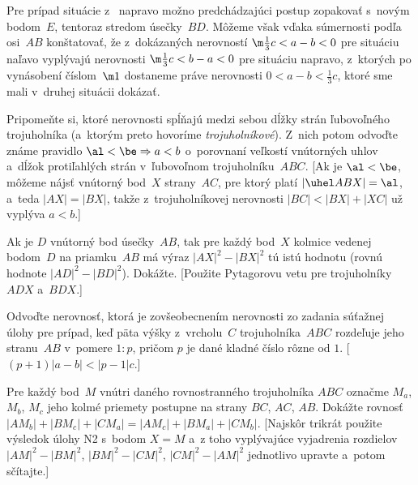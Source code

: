 {Pre prípad situácie z~ napravo možno predchádzajúci postup
zopakovať s~novým bodom~$E$, tentoraz stredom úsečky~$BD$.
Môžeme však vďaka súmernosti podľa osi~$AB$ konštatovať,
že z~dokázaných nerovností ${\m\frac13}c<a-b<0$ pre situáciu naľavo
vyplývajú nerovnosti ${\m\frac13}c<b-a<0$ pre situáciu napravo,
z~ktorých po vynásobení číslom~${\m1}$ dostaneme práve nerovnosti
$0<a-b<\tfrac13 c$, ktoré sme mali v~druhej situácii dokázať.


Pripomeňte si, ktoré nerovnosti spĺňajú medzi sebou
dĺžky strán ľubovoľného trojuholníka (a~ktorým preto hovoríme {\it
trojuholníkové\/}). Z~nich potom odvoďte známe pravidlo
$\al<\be\Rightarrow a<b$ o~porovnaní veľkostí
vnútorných uhlov a~dĺžok protiľahlých strán v~ľubovoľnom trojuholníku~$ABC$.
[Ak je $\al<\be$, môžeme nájsť vnútorný bod~$X$ strany~$AC$, pre ktorý
platí $|\uhel ABX|=\al$, a~teda $|AX|=|BX|$, takže z~trojuholníkovej
nerovnosti $|BC|<|BX|+|XC|$ už vyplýva $a<b$.]

Ak je $D$ vnútorný bod úsečky~$AB$, tak pre každý bod~$X$
kolmice vedenej bodom~$D$ na priamku~$AB$ má výraz $|AX|^2-|BX|^2$
tú istú hodnotu (rovnú hodnote $|AD|^2-|BD|^2$). Dokážte. [Použite
Pytagorovu vetu pre trojuholníky $ADX$ a~$BDX$.]

\D
Odvoďte nerovnosť, ktorá je zovšeobecnením nerovnosti zo
zadania súťažnej úlohy pre prípad, keď päta výšky z~vrcholu~$C$
trojuholníka~$ABC$ rozdeľuje jeho stranu~$AB$ v~pomere $1:p$,
pričom $p$ je dané kladné číslo rôzne od $1$. [$(p+1)|a-b|<|p-1|c$.]

Pre každý bod~$M$ vnútri daného rovnostranného
trojuholníka $ABC$ označme $M_a$, $M_b$, $M_c$ jeho kolmé priemety postupne na
strany $BC$, $AC$, $AB$. Dokážte rovnosť $|AM_b|+|BM_c|+|CM_a|=
|AM_c|+|BM_a|+|CM_b|$. [Najskôr trikrát použite výsledok úlohy N2
s~bodom $X=M$
a~z toho vyplývajúce vyjadrenia rozdielov $|AM|^2-|BM|^2$,
$|BM|^2-|CM|^2$, $|CM|^2-|AM|^2$ jednotlivo upravte a~potom
sčítajte.]
}

